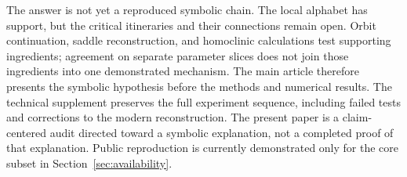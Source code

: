 The answer is not yet a reproduced symbolic chain. The local alphabet has
support, but the critical itineraries and their connections remain open.
Orbit continuation, saddle reconstruction, and homoclinic calculations test
supporting ingredients; agreement on separate parameter slices does not
join those ingredients into one demonstrated mechanism. The main article
therefore presents the symbolic hypothesis before the methods and numerical
results. The technical supplement preserves the full experiment sequence,
including failed tests and corrections to the modern reconstruction.
The present paper is a claim-centered audit directed toward a symbolic
explanation, not a completed proof of that explanation. Public reproduction
is currently demonstrated only for the core subset in
Section~\ref{sec:availability}.
